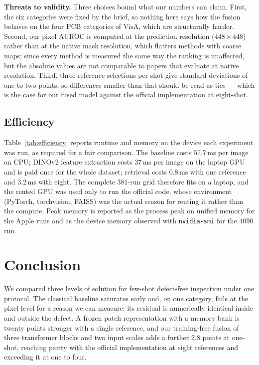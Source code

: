\documentclass[10pt,twocolumn,letterpaper]{article}
\begin{document}
\textbf{Threats to validity.} Three choices bound what our numbers can claim.
First, the six categories were fixed by the brief, so nothing here says how the
fusion behaves on the four PCB categories of VisA, which are structurally
harder. Second, our pixel AUROC is computed at the prediction resolution
($448\times448$) rather than at the native mask resolution, which flatters
methods with coarse maps; since every method is measured the same way the
ranking is unaffected, but the absolute values are not comparable to papers that
evaluate at native resolution. Third, three reference selections per shot give
standard deviations of one to two points, so differences smaller than that
should be read as ties --- which is the case for our fused model against the
official implementation at eight-shot.



\subsection{Efficiency}

Table~\ref{tab:efficiency} reports runtime and memory on the device each
experiment was run, as required for a fair comparison. The baseline costs
$57.7$\,ms per image on CPU; DINOv2 feature extraction costs $37$\,ms per image
on the laptop GPU and is paid once for the whole dataset; retrieval costs
$0.8$\,ms with one reference and $3.2$\,ms with eight. The complete $381$-run
grid therefore fits on a laptop, and the rented GPU was used only to run the
official code, whose environment (PyTorch, torchvision, FAISS) was the actual
reason for renting it rather than the compute. Peak memory is reported as the
process peak on unified memory for the Apple runs and as the device memory
observed with \texttt{nvidia-smi} for the $4090$ run.

\section{Conclusion}

We compared three levels of solution for few-shot defect-free inspection under
one protocol. The classical baseline saturates early and, on one category, fails
at the pixel level for a reason we can measure: its residual is numerically
identical inside and outside the defect. A frozen patch representation with a
memory bank is twenty points stronger with a single reference, and our
training-free fusion of three transformer blocks and two input scales adds a
further $2.8$ points at one-shot, reaching parity with the official
implementation at eight references and exceeding it at one to four.
\end{document}
